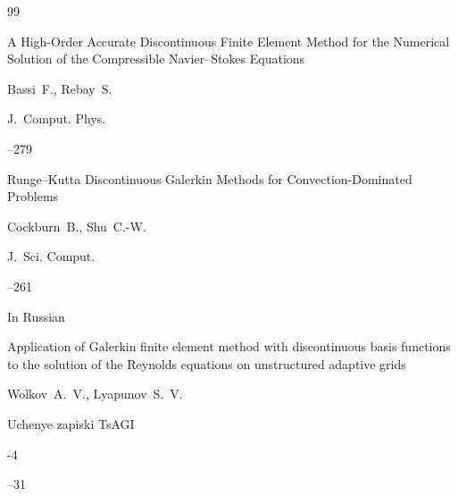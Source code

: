 \pagebreak



\EngRef





\begin{thebibliography}{99}






\paper A High-Order Accurate Discontinuous Finite Element Method for the Numerical Solution of the Compressible Navier–Stokes Equations

\by Bassi~F., Rebay~S.

\jour  J.~Comput. Phys.




--279







\paper Runge–Kutta Discontinuous Galerkin Methods for Convection-Dominated Problems

\by Cockburn~B., Shu~C.-W.

\jour J.~Sci. Comput.




--261





\lang In Russian

\paper Application of Galerkin finite element method with discontinuous basis functions  to the solution of the Reynolds equations on unstructured adaptive grids

\by Wolkov~A.~V., Lyapunov~S.~V.

\jour Uchenye zapiski TsAGI



-4

--31






\end{thebibliography}
